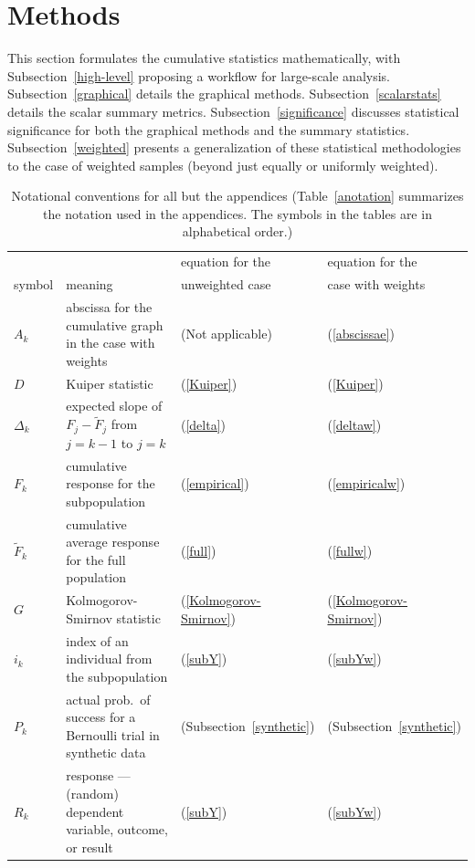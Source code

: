 \documentclass{article}
\begin{document}
\section{Methods}
\label{methods}

This section formulates the cumulative statistics mathematically,
with Subsection~\ref{high-level} proposing a workflow for large-scale analysis.
Subsection~\ref{graphical} details the graphical methods.
Subsection~\ref{scalarstats} details the scalar summary metrics.
Subsection~\ref{significance} discusses statistical significance
for both the graphical methods and the summary statistics.
Subsection~\ref{weighted} presents a generalization
of these statistical methodologies to the case of weighted samples
(beyond just equally or uniformly weighted).


\begin{table}
\caption{Notational conventions for all but the appendices
(Table~\ref{anotation} summarizes the notation used in the appendices.
The symbols in the tables are in alphabetical order.)}
\label{notation}
\begin{center}
\begin{tabular}{llll}
\hline
& & equation for the & equation for the \\
symbol & meaning & unweighted case & case with weights \\\hline
$A_k$ & abscissa for the cumulative graph in the case with weights &
(Not applicable) & (\ref{abscissae}) \\
$D$ & Kuiper statistic & (\ref{Kuiper}) & (\ref{Kuiper}) \\
$\Delta_k$ & expected slope of $F_j - \tilde{F}_j$ from $j = k-1$ to $j = k$ &
(\ref{delta}) & (\ref{deltaw}) \\
$F_k$ & cumulative response for the subpopulation &
(\ref{empirical}) & (\ref{empiricalw}) \\
$\tilde{F}_k$ & cumulative average response for the full population &
(\ref{full}) & (\ref{fullw}) \\
$G$ & Kolmogorov-Smirnov statistic & (\ref{Kolmogorov-Smirnov}) &
(\ref{Kolmogorov-Smirnov}) \\
$i_k$ & index of an individual from the subpopulation &
(\ref{subY}) & (\ref{subYw}) \\
$P_k$ & actual prob.\ of success for a Bernoulli trial in synthetic data &
(Subsection~\ref{synthetic}) & (Subsection~\ref{synthetic}) \\
$R_k$ & response --- (random) dependent variable, outcome,
or result & (\ref{subY}) & (\ref{subYw}) \\

\end{tabular}
\end{center}
\end{table}
\end{document}
